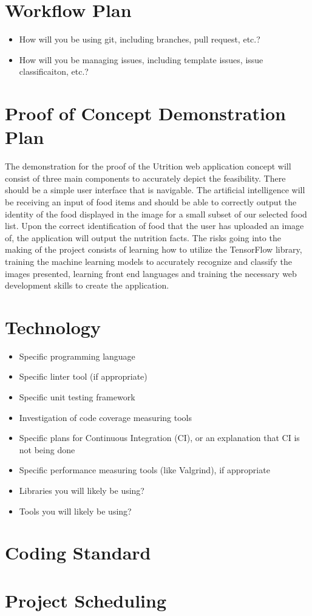 \documentclass{article}
\begin{document}
\section{Workflow Plan}

\begin{itemize}
	\item How will you be using git, including branches, pull request, etc.?
	\item How will you be managing issues, including template issues, issue
	classificaiton, etc.?
\end{itemize}

\section{Proof of Concept Demonstration Plan}

The demonstration for the proof of the Utrition web application concept will consist of three main components to accurately depict the feasibility. There should be a simple user interface that is navigable. The artificial intelligence will be receiving an input of food items and should be able to correctly output the identity of the food displayed in the image for a small subset of our selected food list. Upon the correct identification of food that the user has uploaded an image of, the application will output the nutrition facts. The risks going into the making of the project consists of learning how to utilize the TensorFlow library, training the machine learning models to accurately recognize and classify the images presented, learning front end languages and training the necessary web development skills to create the application. 

\section{Technology}

\begin{itemize}
\item Specific programming language
\item Specific linter tool (if appropriate)
\item Specific unit testing framework
\item Investigation of code coverage measuring tools
\item Specific plans for Continuous Integration (CI), or an explanation that CI
  is not being done
\item Specific performance measuring tools (like Valgrind), if
  appropriate
\item Libraries you will likely be using?
\item Tools you will likely be using?
\end{itemize}

\section{Coding Standard}

\section{Project Scheduling}

\end{document}
